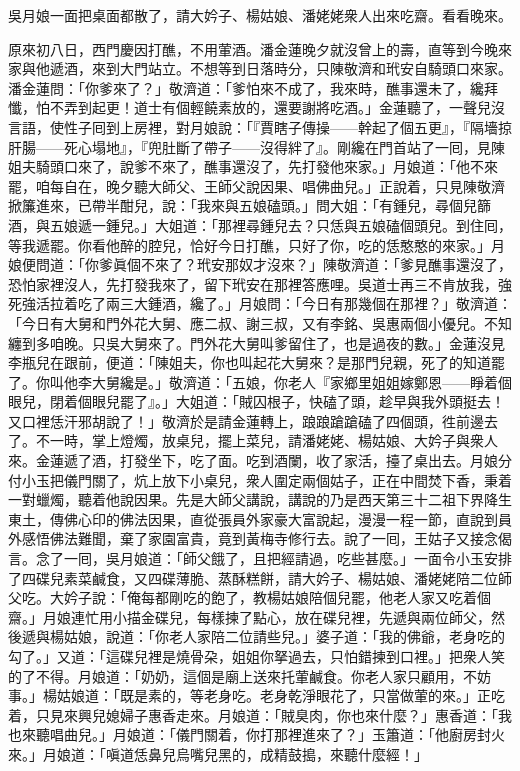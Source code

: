 吳月娘一面把桌面都散了，請大妗子、楊姑娘、潘姥姥衆人出來吃齋。看看晚來。

原來初八日，西門慶因打醮，不用葷酒。潘金蓮晚夕就沒曾上的壽，直等到今晚來家與他遞酒，來到大門站立。不想等到日落時分，只陳敬濟和玳安自騎頭口來家。潘金蓮問：「你爹來了？」敬濟道：「爹怕來不成了，我來時，醮事還未了，纔拜懺，怕不弄到起更！道士有個輕饒素放的，還要謝將吃酒。」金蓮聽了，一聲兒沒言語，使性子囘到上房裡，對月娘說：「『賈瞎子傳操——幹起了個五更』，『隔墻掠肝腸——死心塌地』，『兜肚斷了帶子——沒得絆了』。{}剛纔在門首站了一囘，見陳姐夫騎頭口來了，說爹不來了，醮事還沒了，先打發他來家。」月娘道：「他不來罷，咱每自在，晚夕聽大師父、王師父說因果、唱佛曲兒。」{}正說着，只見陳敬濟掀簾進來，已帶半酣兒，說：「我來與五娘磕頭。」問大姐：「有鍾兒，尋個兒篩酒，與五娘遞一鍾兒。」大姐道：「那裡尋鍾兒去？只恁與五娘磕個頭兒。到住囘，等我遞罷。你看他醉的腔兒，恰好今日打醮，只好了你，吃的恁憨憨的來家。」月娘便問道：「你爹眞個不來了？玳安那奴才沒來？」陳敬濟道：「爹見醮事還沒了，恐怕家裡沒人，先打發我來了，留下玳安在那裡答應哩。吳道士再三不肯放我，強死強活拉着吃了兩三大鍾酒，{}纔了。」月娘問：「今日有那幾個在那裡？」敬濟道：「今日有大舅和門外花大舅、應二叔、謝三叔，又有李銘、吳惠兩個小優兒。不知纏到多咱晚。只吳大舅來了。門外花大舅叫爹留住了，也是過夜的數。」金蓮沒見李瓶兒在跟前，便道：「陳姐夫，你也叫起花大舅來？是那門兒親，死了的知道罷了。你叫他李大舅纔是。」{}敬濟道：「五娘，你老人『家鄉里姐姐嫁鄭恩——睜着個眼兒，閉着個眼兒罷了』。」大姐道：「賊囚根子，快磕了頭，趁早與我外頭挺去！{}又口裡恁汗邪胡說了！」敬濟於是請金蓮轉上，踉踉蹌蹌磕了四個頭，{}徃前邊去了。不一時，掌上燈燭，放桌兒，擺上菜兒，請潘姥姥、楊姑娘、大妗子與衆人來。金蓮遞了酒，打發坐下，吃了面。吃到酒闌，收了家活，擡了桌出去。月娘分付小玉把儀門關了，炕上放下小桌兒，衆人圍定兩個姑子，正在中間焚下香，秉着一對蠟燭，聽着他說因果。先是大師父講說，講說的乃是西天第三十二祖下界降生東土，傳佛心印的佛法因果，直從張員外家豪大富說起，漫漫一程一節，直說到員外感悟佛法難聞，棄了家園富貴，竟到黃梅寺修行去。說了一囘，王姑子又接念偈言。念了一囘，吳月娘道：「師父餓了，且把經請過，吃些甚麼。」一面令小玉安排了四碟兒素菜鹹食，又四碟薄脆、蒸酥糕餅，請大妗子、楊姑娘、潘姥姥陪二位師父吃。大妗子說：「俺每都剛吃的飽了，教楊姑娘陪個兒罷，他老人家又吃着個齋。」月娘連忙用小描金碟兒，每樣揀了點心，放在碟兒裡，先遞與兩位師父，然後遞與楊姑娘，說道：「你老人家陪二位請些兒。」婆子道：「我的佛爺，老身吃的勾了。」又道：「這碟兒裡是燒骨朶，姐姐你拏過去，只怕錯揀到口裡。」把衆人笑的了不得。月娘道：「奶奶，這個是廟上送來托葷鹹食。你老人家只顧用，不妨事。」楊姑娘道：「既是素的，等老身吃。老身乾淨眼花了，只當做葷的來。」正吃着，只見來興兒媳婦子惠香走來。月娘道：「賊臭肉，你也來什麼？」惠香道：「我也來聽唱曲兒。」月娘道：「儀門關着，你打那裡進來了？」玉簫道：「他廚房封火來。」月娘道：「嗔道恁鼻兒烏嘴兒黑的，成精鼓搗，來聽什麼經！」{}

